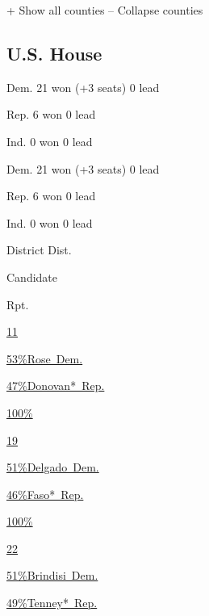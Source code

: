 + Show all counties -- Collapse counties

\hypertarget{us-house}{%
\subsection{U.S. House}\label{us-house}}

Dem. 21 won (+3 seats) 0 lead

Rep. 6 won 0 lead

Ind. 0 won 0 lead

Dem. 21 won (+3 seats) 0 lead

Rep. 6 won 0 lead

Ind. 0 won 0 lead

District Dist.

Candidate

Rpt.

\href{https://www.nytimes3xbfgragh.onion/elections/results/new-york-house-district-11}{11}

\href{https://www.nytimes3xbfgragh.onion/elections/results/new-york-house-district-11}{
53\%Rose~Dem.}

\href{https://www.nytimes3xbfgragh.onion/elections/results/new-york-house-district-11}{
47\%Donovan*~Rep.}

\href{https://www.nytimes3xbfgragh.onion/elections/results/new-york-house-district-11}{100\%}

\href{https://www.nytimes3xbfgragh.onion/elections/results/new-york-house-district-11}{}

\href{https://www.nytimes3xbfgragh.onion/elections/results/new-york-house-district-19}{19}

\href{https://www.nytimes3xbfgragh.onion/elections/results/new-york-house-district-19}{
51\%Delgado~Dem.}

\href{https://www.nytimes3xbfgragh.onion/elections/results/new-york-house-district-19}{
46\%Faso*~Rep.}

\href{https://www.nytimes3xbfgragh.onion/elections/results/new-york-house-district-19}{100\%}

\href{https://www.nytimes3xbfgragh.onion/elections/results/new-york-house-district-19}{}

\href{https://www.nytimes3xbfgragh.onion/elections/results/new-york-house-district-22}{22}

\href{https://www.nytimes3xbfgragh.onion/elections/results/new-york-house-district-22}{
51\%Brindisi~Dem.}

\href{https://www.nytimes3xbfgragh.onion/elections/results/new-york-house-district-22}{
49\%Tenney*~Rep.}

